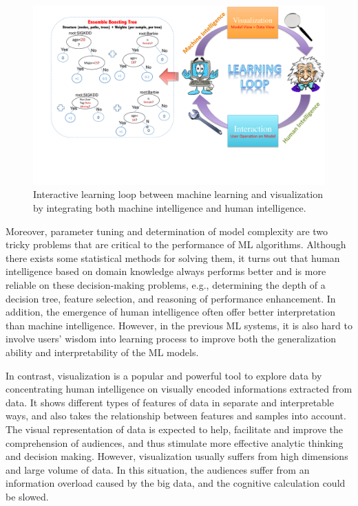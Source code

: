 \documentclass{chi2009}
\begin{document}
\begin{figure}[tH!]
\begin{center}
 \includegraphics[width=0.9\linewidth]{loop.pdf}
\end{center}
   \caption{Interactive learning loop between machine learning and visualization by integrating both machine intelligence and human intelligence.}
\label{fig:system}
\end{figure} 

Moreover, parameter tuning and determination of model complexity are two tricky problems that are critical to the performance of ML algorithms. Although there exists some statistical methods for solving them, it turns out that human intelligence based on domain knowledge always performs better and is more reliable on these decision-making problems, e.g., determining the depth of a decision tree, feature selection, and reasoning of performance enhancement. In addition, the emergence of human intelligence often offer better interpretation than machine intelligence. However, in the previous ML systems, it is also hard to involve users’ wisdom into learning process to improve both the generalization ability and interpretability of the ML models. 

In contrast, visualization \cite{visual} is a popular and powerful tool to explore data by concentrating human intelligence on visually encoded informations extracted from data. It shows different types of features of data in separate and interpretable ways, and also takes the relationship between features and samples into account. The visual representation of data is expected to help, facilitate and improve the comprehension of audiences, and thus stimulate more effective analytic thinking and decision making. However, visualization usually suffers from high dimensions and large volume of data. In this situation, the audiences suffer from an information overload caused by the big data, and the cognitive calculation could be slowed.
\end{document}
